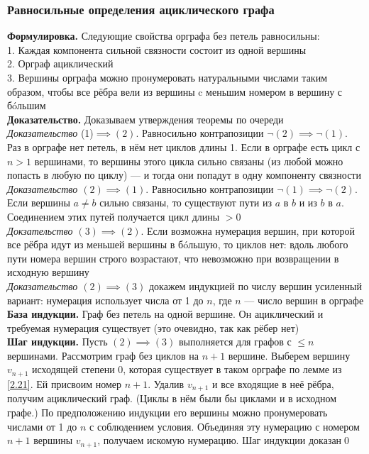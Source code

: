 \documentclass[a4paper]{article}
\begin{document}
\subsubsection*{Равносильные определения ациклического графа}
\textbf{Формулировка.} Следующие свойства орграфа без петель равносильны:\\[2mm]
 1. Каждая компонента сильной связности состоит из одной вершины\\[2mm]
 2. Орграф ациклический\\[2mm]
3. Вершины орграфа можно пронумеровать натуральными числами таким образом, чтобы все рёбра вели из вершины c меньшим номером в вершину с б\'oльшим\\[2mm]
\textbf{Доказательство.} Доказываем утверждения теоремы по очереди\\[2mm]
\textit{Доказательство} (1)$\implies(2)$. Равносильно контрапозиции $\neg(2)\implies\neg(1)$. Раз в орграфе нет петель, в нём нет циклов длины 1. Если в орграфе есть цикл с $n > 1$ вершинами, то вершины этого цикла сильно связаны (из любой можно попасть в любую по циклу) — и тогда они попадут в одну компоненту связности\\[3mm]
\textit{Доказательство $(2)\implies(1)$}. Равносильно контрапозиции $\neg(1)\implies\neg(2)$. Если вершины $a\ne b$ сильно связаны, то существуют пути из $a$ в $b$ и из $b$ в $a$. Соединением этих путей получается цикл длины $> 0$\\[3mm]
\textit{Докзательство $(3)\implies(2)$}. Если возможна нумерация вершин, при которой все рёбра идут из меньшей вершины в б\'oльшую, то циклов нет: вдоль любого пути номера вершин строго возрастают, что невозможно при возвращении в исходную вершину\\[3mm]
\textit{Доказательство $(2)\implies(3)$ }докажем индукцией по числу вершин усиленный вариант: нумерация использует числа от 1 до $n$, где $n$ — число вершин в орграфе\\[2mm]
\textbf{База индукции.} Граф без петель на одной вершине. Он ациклический и требуемая нумерация существует (это очевидно, так как рёбер нет)\\[2mm]
\textbf{Шаг индукции.} Пусть $(2)\implies(3)$ выполняется для графов с $\leqslant n$ вершинами. Рассмотрим граф без циклов на $n+1$ вершине. Выберем вершину $v_{n+1}$ исходящей степени 0, которая существует в таком орграфе по лемме из \ref{2.21}. Ей присвоим номер $n + 1$. Удалив $v_{n+1}$ и все входящие в неё рёбра, получим ациклический граф. (Циклы в нём были бы циклами и в исходном графе.) По предположению индукции его вершины можно пронумеровать числами от 1 до $n$ с соблюдением условия. Объединяя эту нумерацию с номером $n + 1$ вершины $v_{n+1}$, получаем искомую нумерацию. Шаг индукции доказан\qed
\end{document}
